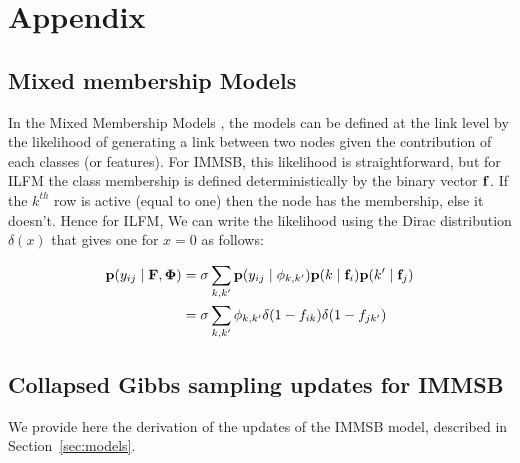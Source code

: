 \section{Appendix}
\label{sec:append}

\subsection{Mixed membership Models}
\label{sec:mixmembership}
In the Mixed Membership Models \cite{MMM}, the models can be defined at the link level by the likelihood of generating a link between two nodes given the contribution of each classes (or features). For IMMSB, this likelihood is straightforward, but for ILFM the class membership is defined deterministically by the binary vector $\mathbf{f}$. If the $k^{th}$ row is active (equal to one) then the node has the membership, else it doesn't. Hence for ILFM, We can write the likelihood  using the Dirac distribution $\delta(x)$ that gives one for $x=0$ as follows:

\begin{align}
    \mathbf{p}(y_{ij} \mid \mathbf{F}, \mathbf{\Phi } ) &= \sigma \sum_{k, k'} \mathbf{p}(y_{ij}\mid\phi_{k,k'}) \mathbf{p}(k \mid \mathbf{f}_i) \mathbf{p}(k' \mid \mathbf{f}_j) \\
    &=  \sigma \sum_{k, k'} \phi_{k,k'}  \delta(1-f_{ik}) \delta(1-f_{jk'})
    \end{align}
    

\subsection{Collapsed Gibbs sampling updates for IMMSB}

We provide here the derivation of the updates of the IMMSB model, described in Section~\ref{sec:models}.




